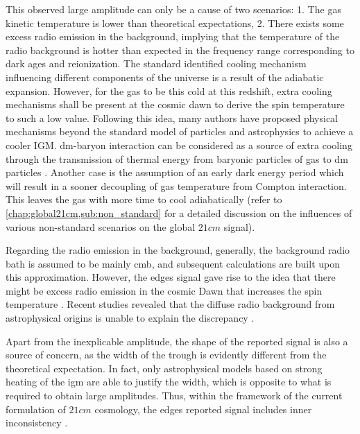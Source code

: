 \documentclass[12pt, TexShade, letterpaper]{report}
\begin{document}
 This observed large amplitude can only be a cause of two scenarios: 1. The gas kinetic temperature is lower than theoretical expectations, 2. There exists some excess radio emission in the background, implying that the temperature of the radio background is hotter than expected in the frequency range corresponding to dark ages and reionization. The standard identified cooling mechanism influencing different components of the universe is a result of the adiabatic expansion. However, for the gas to be this cold at this redshift, extra cooling mechanisms shall be present at the cosmic dawn to derive the spin temperature to such a low value. Following this idea, many authors have proposed physical mechanisms beyond the standard model of particles and astrophysics to achieve a cooler IGM. \gls{dm}-baryon interaction can be considered as a source of extra cooling through the transmission of thermal energy from baryonic particles of gas to \gls{dm} particles \cite{dm_edges_1, dm_edges_2, dm_edges_3, dm_edges_4, dm_edges_5, dm_edges_6}. Another case is the assumption of an early dark energy period which will result in a sooner decoupling of gas temperature from Compton interaction. This leaves the gas with more time to cool adiabatically \cite{early_dark_energy, thesis_shedding} (refer to \ref{chap:global21cm,sub:non_standard} for a detailed discussion on the influences of various non-standard scenarios on the global $21cm$ signal).\par
 Regarding the radio emission in the background, generally, the background radio bath is assumed to be mainly \gls{cmb}, and subsequent calculations are built upon this approximation. However, the \gls{edges} signal gave rise to the idea that there might be excess radio emission in the cosmic Dawn that increases the spin temperature \cite{excess_radio}. Recent studies revealed that the diffuse radio background from astrophysical origins is unable to explain the discrepancy \cite{excess_radio, thesis_shedding}.\par
 Apart from the inexplicable amplitude, the shape of the reported signal is also a source of concern, as the width of the trough is evidently different from the theoretical expectation. In fact, only astrophysical models based on strong heating of the \gls{igm} are able to justify the width, which is opposite to what is required to obtain large amplitudes. Thus, within the framework of the current formulation of $21cm$ cosmology, the \gls{edges} reported signal includes inner inconsistency \cite{edges_inconsistent_inner, thesis_shedding}.\par
\end{document}
